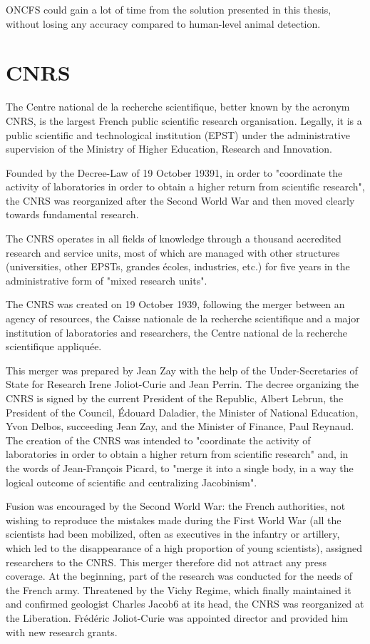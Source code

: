 ONCFS could gain a lot of time from the solution presented in this thesis, without losing any accuracy compared to human-level animal detection.

\pagebreak\section{CNRS}

The Centre national de la recherche scientifique, better known by the acronym CNRS, is the largest French public scientific research organisation. Legally, it is a public scientific and technological institution (EPST) under the administrative supervision of the Ministry of Higher Education, Research and Innovation.

Founded by the Decree-Law of 19 October 19391, in order to "coordinate the activity of laboratories in order to obtain a higher return from scientific research", the CNRS was reorganized after the Second World War and then moved clearly towards fundamental research.

The CNRS operates in all fields of knowledge through a thousand accredited research and service units, most of which are managed with other structures (universities, other EPSTs, grandes écoles, industries, etc.) for five years in the administrative form of "mixed research units".


The CNRS was created on 19 October 1939, following the merger between an agency of resources, the Caisse nationale de la recherche scientifique and a major institution of laboratories and researchers, the Centre national de la recherche scientifique appliquée.

This merger was prepared by Jean Zay with the help of the Under-Secretaries of State for Research Irene Joliot-Curie and Jean Perrin. The decree organizing the CNRS is signed by the current President of the Republic, Albert Lebrun, the President of the Council, Édouard Daladier, the Minister of National Education, Yvon Delbos, succeeding Jean Zay, and the Minister of Finance, Paul Reynaud. The creation of the CNRS was intended to "coordinate the activity of laboratories in order to obtain a higher return from scientific research" and, in the words of Jean-François Picard, to "merge it into a single body, in a way the logical outcome of scientific and centralizing Jacobinism".

Fusion was encouraged by the Second World War: the French authorities, not wishing to reproduce the mistakes made during the First World War (all the scientists had been mobilized, often as executives in the infantry or artillery, which led to the disappearance of a high proportion of young scientists), assigned researchers to the CNRS. This merger therefore did not attract any press coverage. At the beginning, part of the research was conducted for the needs of the French army. Threatened by the Vichy Regime, which finally maintained it and confirmed geologist Charles Jacob6 at its head, the CNRS was reorganized at the Liberation. Frédéric Joliot-Curie was appointed director and provided him with new research grants.

